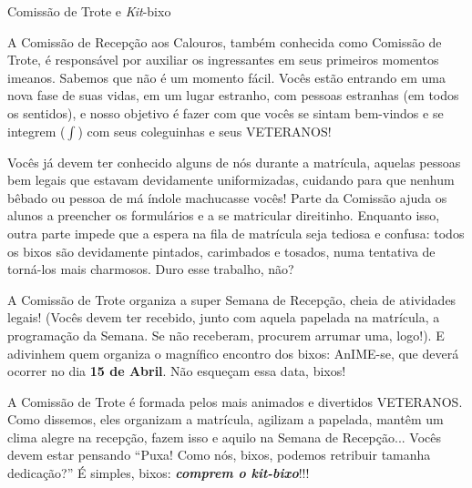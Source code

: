 \begin{secao}{Comissão de Trote e \textit{Kit}-bixo}

A Comissão de Recepção aos Calouros, também conhecida como Comissão de Trote, é
responsável por auxiliar os ingressantes em seus primeiros momentos imeanos.
Sabemos que não é um momento fácil. Vocês estão entrando em uma nova fase de
suas vidas, em um lugar estranho, com pessoas estranhas (em todos os sentidos),
e nosso objetivo é fazer com que vocês se sintam bem-vindos e se integrem
($\int$) com seus coleguinhas e seus VETERANOS!

Vocês já devem ter conhecido alguns de nós durante a matrícula, aquelas pessoas
bem legais que estavam devidamente uniformizadas, cuidando para que nenhum
bêbado ou pessoa de má índole machucasse vocês! Parte da Comissão ajuda os
alunos a preencher os formulários e a se matricular direitinho. Enquanto isso,
outra parte impede que a espera na fila de matrícula seja tediosa e confusa:
todos os bixos são devidamente pintados, carimbados e tosados, numa tentativa
de torná-los mais charmosos. Duro esse trabalho, não?

A Comissão de Trote organiza a super Semana de Recepção, cheia de atividades
legais! (Vocês devem ter recebido, junto com aquela papelada na matrícula, a
programação da Semana. Se não receberam, procurem arrumar uma, logo!).
E adivinhem quem organiza o magnífico encontro dos bixos: AnIME-se, que deverá
ocorrer no dia \textbf{15 de Abril}. Não esqueçam essa data, bixos! %

A Comissão de Trote é formada pelos mais animados e divertidos VETERANOS. Como
dissemos, eles organizam a matrícula, agilizam a papelada, mantêm um clima
alegre na recepção, fazem isso e aquilo na Semana de Recepção...
Vocês devem estar pensando ``Puxa! Como nós, bixos, podemos retribuir
tamanha dedicação?'' É simples, bixos: {\bf\em comprem o \textit{kit}-bixo}!!!


\end{secao}
